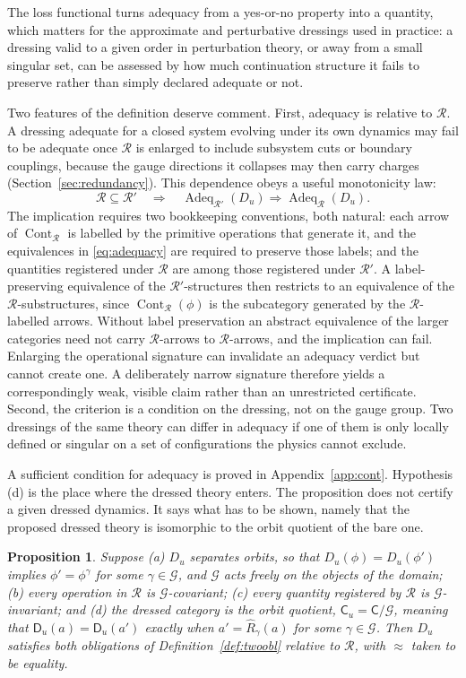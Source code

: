 \documentclass[11pt]{article}
\theoremstyle{plain}
\newtheorem{proposition}{Proposition}
\theoremstyle{definition}
\theoremstyle{remark}
\newcommand{\G}{\mathcal G}
\newcommand{\R}{\mathcal R}
\newcommand{\Cont}{\operatorname{Cont}}
\begin{document}
The loss functional turns adequacy from a yes-or-no property into a quantity, which matters for the approximate and perturbative dressings used in practice: a dressing valid to a given order in perturbation theory, or away from a small singular set, can be assessed by how much continuation structure it fails to preserve rather than simply declared adequate or not.

Two features of the definition deserve comment. First, adequacy is relative to $\R$. A dressing adequate for a closed system evolving under its own dynamics may fail to be adequate once $\R$ is enlarged to include subsystem cuts or boundary couplings, because the gauge directions it collapses may then carry charges (Section~\ref{sec:redundancy}). This dependence obeys a useful monotonicity law:
\begin{equation}\label{eq:monotoneR}
\R\subseteq\R'
\quad\Longrightarrow\quad
\operatorname{Adeq}_{\R'}(D_u)\Longrightarrow\operatorname{Adeq}_{\R}(D_u).
\end{equation}
The implication requires two bookkeeping conventions, both natural: each arrow of $\Cont_\R$ is labelled by the primitive operations that generate it, and the equivalences in \eqref{eq:adequacy} are required to preserve those labels; and the quantities registered under $\R$ are among those registered under $\R'$. A label-preserving equivalence of the $\R'$-structures then restricts to an equivalence of the $\R$-substructures, since $\Cont_\R(\phi)$ is the subcategory generated by the $\R$-labelled arrows. Without label preservation an abstract equivalence of the larger categories need not carry $\R$-arrows to $\R$-arrows, and the implication can fail. Enlarging the operational signature can invalidate an adequacy verdict but cannot create one. A deliberately narrow signature therefore yields a correspondingly weak, visible claim rather than an unrestricted certificate. Second, the criterion is a condition on the dressing, not on the gauge group. Two dressings of the same theory can differ in adequacy if one of them is only locally defined or singular on a set of configurations the physics cannot exclude.

A sufficient condition for adequacy is proved in Appendix~\ref{app:cont}. Hypothesis (d) is the place where the dressed theory enters. The proposition does not certify a given dressed dynamics. It says what has to be shown, namely that the proposed dressed theory is isomorphic to the orbit quotient of the bare one.

\begin{proposition}\label{prop:suff}
Suppose (a) $D_u$ separates orbits, so that $D_u(\phi)=D_u(\phi')$ implies $\phi'=\phi^\gamma$ for some $\gamma\in\G$, and $\G$ acts freely on the objects of the domain; (b) every operation in $\R$ is $\G$-covariant; (c) every quantity registered by $\R$ is $\G$-invariant; and (d) the dressed category is the orbit quotient, $\mathsf C_u=\mathsf C/\G$, meaning that $\mathsf D_u(a)=\mathsf D_u(a')$ exactly when $a'=\widehat R_\gamma(a)$ for some $\gamma\in\G$. Then $D_u$ satisfies both obligations of Definition~\ref{def:twoobl} relative to $\R$, with $\approx$ taken to be equality.
\end{proposition}
\end{document}
